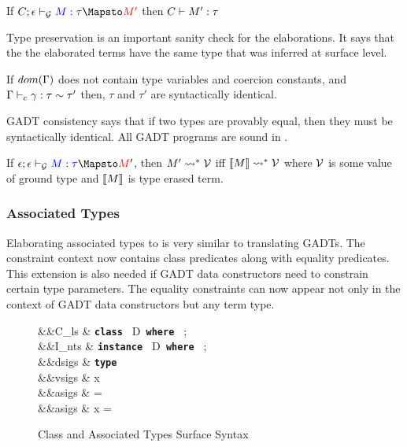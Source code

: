 \documentclass[manuscript,screen,nonacm]{acmart}
\begin{document}
\begin{lemma}
  If $\GTranslate C \empt \Tm \tau {\Tm'}$ then $C \vdash M' : \tau$
\end{lemma}
Type preservation is an important sanity check for the elaborations. It says that the the elaborated terms have the same type that was inferred at surface level.

\begin{theorem}
  If $dom(\Gamma)$ does not contain type variables and coercion constants, and $\Gamma \vdash_{c} \gamma : \tau\sim\tau'$ then, $\tau$ and $\tau'$ are syntactically identical.
\end{theorem}
GADT consistency says that if two types are provably equal, then they must be syntactically identical. All GADT programs are sound in \SFC.

\begin{theorem}
  If $\GTranslate \empt \empt \Tm \tau \Tm'$, then $M' \rightsquigarrow^* \mathcal{V}$ iff $\llbracket M\rrbracket \rightsquigarrow^* \mathcal{V}$ where $\mathcal{V}$ is some value of ground type and $\llbracket M\rrbracket$ is type erased term.
\end{theorem}

\subsubsection{Associated Types}
Elaborating associated types to \SFC is very similar to translating GADTs. The constraint context now contains class predicates along with equality predicates. This extension is also needed if GADT data constructors need to constrain certain type parameters. The equality constraints can now appear not only in the context of GADT data constructors but any term type.

\begin{figure}[ht]
  \centering
  \begin{syntax}
     &&C_{ls} \bnfeq& \textbf{\texttt{class }} D\App\many\TyVar \textbf{\texttt{ where }} ; \\
     &&I_{nts} \bnfeq& \textbf{\texttt{instance }} D\App\many\tau \textbf{\texttt{ where }} ; \\
     &&dsigs \bnfeq& \textbf{\texttt{type }} \tau\\
     &&vsigs \bnfeq& x\co\tau\\
     &&asigs \bnfeq& \tau = \sigma\\
     &&asigs \bnfeq& x = \Tm
  \end{syntax}
  \caption[Class Syntax]{Class and Associated Types Surface Syntax}
  \label{fig:assoc-types-syntax}
\end{figure}
\end{document}
